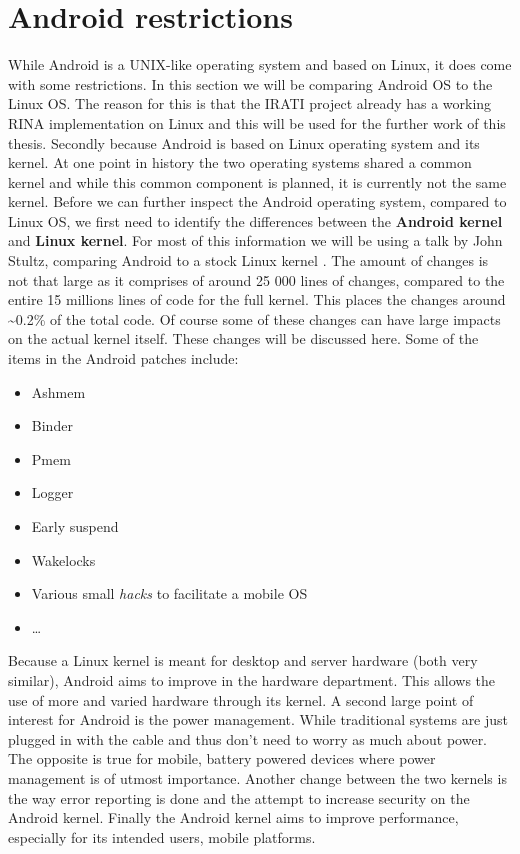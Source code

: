 \section{Android restrictions}
While Android is a UNIX-like operating system and based on Linux, it does come with some restrictions. In this section we will be comparing Android OS to the Linux OS. The reason for this is that the IRATI project already has a working RINA implementation on Linux and this will be used for the further work of this thesis. Secondly because Android is based on Linux operating system and its kernel. At one point in history the two operating systems shared a common kernel and while this common component is planned, it is currently not the same kernel. 
\npar
Before we can further inspect the Android operating system, compared to Linux OS, we first need to identify the differences between the \textbf{Android kernel} and \textbf{Linux kernel}. For most of this information we will be using a talk by John Stultz, comparing Android to a stock Linux kernel \citep{presentation:android_linux_kernel,website:android_linux_kernel}. The amount of changes is not that large as it comprises of around 25 000 lines of changes, compared to the entire 15 millions lines of code for the full kernel. This places the changes around \textasciitilde0.2\% of the total code. Of course some of these changes can have large impacts on the actual kernel itself. These changes will be discussed here. Some of the items in the Android patches include:
\begin{itemize}
	\item Ashmem
	\item Binder
	\item Pmem
	\item Logger
	\item Early suspend
	\item Wakelocks
	\item Various small \emph{hacks} to facilitate a mobile OS
	\item \ldots
\end{itemize}
Because a Linux kernel is meant for desktop and server hardware (both very similar), Android aims to improve in the hardware department. This allows the use of more and varied hardware through its kernel. A second large point of interest for Android is the power management. While traditional systems are just plugged in with the cable and thus don't need to worry as much about power. The opposite is true for mobile, battery powered devices where power management is of utmost importance. Another change between the two kernels is the way error reporting is done and the attempt to increase security on the Android kernel. Finally the Android kernel aims to improve performance, especially for its intended users, mobile platforms.

